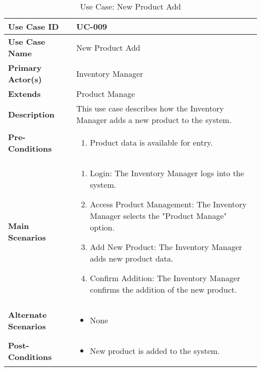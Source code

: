 \documentclass{article}
\begin{document}
\begin{table}[!ht]
    \centering
    \renewcommand{\arraystretch}{1.3} %
    \begin{tabularx}{\textwidth}{|l|X|}
        \hline
        \textbf{Use Case ID} & UC-009 \\
        \hline
        \textbf{Use Case Name} & New Product Add \\
        \hline
        \textbf{Primary Actor(s)} & Inventory Manager \\
        \hline
        \textbf{Extends} & Product Manage \\
        \hline
        \textbf{Description} & This use case describes how the Inventory Manager adds a new product to the system. \\
        \hline
        \textbf{Pre-Conditions} & 
        \begin{enumerate}[label=\arabic*.,itemsep=0pt]
            \item Product data is available for entry.
        \end{enumerate} \\
        \hline
        \textbf{Main Scenarios} & 
        \begin{enumerate}[label=\arabic*.,itemsep=0pt]
            \item Login: The Inventory Manager logs into the system.
            \item Access Product Management: The Inventory Manager selects the "Product Manage" option.
            \item Add New Product: The Inventory Manager adds new product data.
            \item Confirm Addition: The Inventory Manager confirms the addition of the new product.
        \end{enumerate} \\
        \hline
        \textbf{Alternate Scenarios} & 
        \begin{itemize}[label=--,itemsep=0pt]
            \item None
        \end{itemize} \\
        \hline
        \textbf{Post-Conditions} & 
        \begin{itemize}[label=--,itemsep=0pt]
            \item New product is added to the system.
        \end{itemize} \\
        \hline
    \end{tabularx}
    \caption{Use Case: New Product Add}
    \label{tab:use-case-new-product-add}
\end{table}
\end{document}
